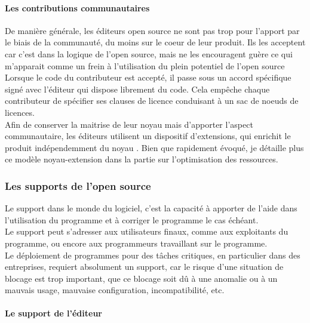 				\paragraph{Les contributions communautaires\\}

				De manière générale, les éditeurs open source ne sont pas trop pour l'apport par le biais de la communauté, du moins sur le coeur de leur produit. Ils les acceptent car c'est dans la logique de l'open source, mais ne les encouragent guère ce qui m'apparait comme un frein à l'utilisation du plein potentiel de l'open source\\

				Lorsque le code du contributeur est accepté, il passe sous un accord spécifique signé avec l'éditeur qui dispose librement du code. Cela empêche chaque contributeur de spécifier ses clauses de licence conduisant à un sac de noeuds de licences.\\

				Afin de conserver la maitrise de leur noyau mais d'apporter l'aspect communautaire, les éditeurs utilisent un dispositif d'extensions, qui enrichit le produit indépendemment du noyau . Bien que rapidement évoqué, je détaille plus ce modèle noyau-extension dans la partie sur l'optimisation des ressources.

			\subsubsection{Les supports de l'open source}

				Le support dans le monde du logiciel, c'est la capacité à apporter de l'aide dans l'utilisation du programme et à corriger le programme le cas échéant.\\
				
				Le support peut s'adresser aux utilisateurs finaux, comme aux exploitants du programme, ou encore aux programmeurs travaillant sur le programme.\\
				
				Le déploiement de programmes pour des tâches critiques, en particulier dans des entreprises, requiert absolument un support, car le risque d'une situation de blocage est trop important, que ce blocage soit dû à une anomalie ou à un mauvais usage, mauvaise configuration, incompatibilité, etc.

				\paragraph{Le support de l'éditeur\\}

